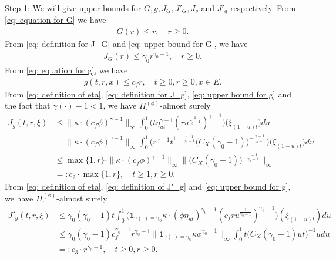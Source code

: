 \documentclass[12pt,a4paper]{amsart}
\theoremstyle{definition}
\numberwithin{equation}{section}
\begin{document}
Step 1:
We will give upper bounds for $G,g, J_G, J'_G, J_g$ and $J'_g$ respectively.
From \eqref{eq: equation for G} we have
\begin{align}\label{eq: upper bound for G}
	G(r)
	\leq r,
	\quad r \geq 0.
\end{align}	
From \eqref{eq: definition for J_G} and \eqref{eq: upper bound for G}, we have
\begin{align}\label{eq: upper bound for J_G}
	J_G(r)
	\leq \gamma_0 r^{\gamma_0 - 1},
	\quad r \geq 0.
\end{align}
From \eqref{eq: equation for g}, we have
\begin{align}\label{eq: upper bound for g}
	g(t,r, x) \leq c_f r,
	\quad t\geq 0, r \geq 0, x\in E.
\end{align}
From \eqref{eq: definition of eta}, \eqref{eq: definition for J_g}, \eqref{eq: upper bound for g} and the fact that $\gamma(\cdot) - 1 < 1$, we have $\Pi^{(\phi)}_{\cdot}$-almost surely
\begin{align}
	J_g(t,r, \xi)
	&\leq \|\kappa \cdot (c_f\phi)^{\gamma - 1} \|_\infty \int_0^1 \big(  t\eta_{ut}^{\gamma - 1} (ru^{\frac{1}{\gamma_0 - 1}} )^{\gamma-1}  \big) \big(  \xi_{(1-u)t} \big) du
	\\&= \| \kappa \cdot (c_f\phi)^{\gamma - 1} \|_\infty \int_0^1 \big(  r^{\gamma - 1}t^{1-\frac{\gamma - 1}{\gamma_0 - 1}}  \big( C_X (\gamma_0 - 1) \big)^{-\frac{\gamma - 1}{\gamma_0 - 1}}  \big) \big( \xi_{(1-u)t} \big) du
	\\& \leq \max\{1,r\} \cdot \| \kappa \cdot (c_f\phi)^{\gamma - 1} \|_\infty \Big\|  \big( C_X (\gamma_0 - 1) \big)^{-\frac{\gamma - 1}{\gamma_0 - 1}}\Big\|_\infty
	\\& =: c_2 \cdot \max  \{1,r\},
	\quad t\geq 1, r\geq 0.
\end{align}
From \eqref{eq: definition of eta}, \eqref{eq: definition of J'_g} and \eqref{eq: upper bound for g}, we have $\Pi_{\cdot}^{(\phi)}$-almost surely
\begin{align}
	J'_g(t,r,\xi)
	&\leq \gamma_0 (\gamma_0 - 1) t \int_0^1 \big( \mathbf 1_{\gamma(\cdot) = \gamma_0} \kappa \cdot (\phi \eta_{ut})^{\gamma_0 - 1} (c_f ru^{\frac{1}{\gamma_0 - 1}})^{\gamma_0 - 1}\big) (\xi_{(1-u)t}) du
	\\&\leq \gamma_0(\gamma_0 - 1) c_f^{\gamma_0 - 1}r^{\gamma_0 - 1} \|  \mathbf 1_{\gamma(\cdot) = \gamma_0}  \kappa \phi^{\gamma_0 - 1} \|_\infty \int_0^1 t \big( C_X(\gamma_0 - 1) ut \big)^{- 1} u du
	\\&=: c_3 \cdot r^{\gamma_0 - 1},
	\quad t\geq 0, r\geq 0.
\end{align}
\end{document}
